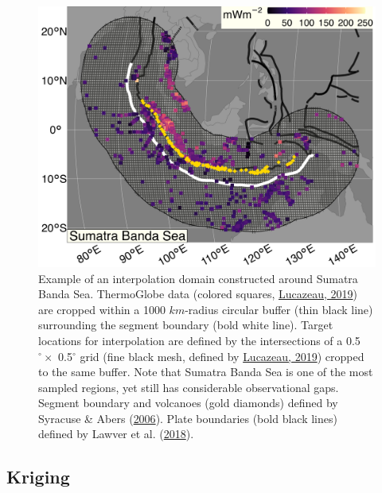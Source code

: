 \begin{figure}[htbp]

{\centering \includegraphics[width=1\linewidth,]{assets/figs/chpt3/SumatraBandaSeaInterp} 

}

\caption[Example of an interpolation domain constructed around Sumatra Banda Sea]{Example of an interpolation domain constructed around Sumatra Banda Sea. ThermoGlobe data (colored squares, \protect\hyperlink{ref-lucazeau2019}{Lucazeau, 2019}) are cropped within a 1000 \(km\)-radius circular buffer (thin black line) surrounding the segment boundary (bold white line). Target locations for interpolation are defined by the intersections of a 0.5\(^\circ \times\) 0.5\(^\circ\) grid (fine black mesh, defined by \protect\hyperlink{ref-lucazeau2019}{Lucazeau, 2019}) cropped to the same buffer. Note that Sumatra Banda Sea is one of the most sampled regions, yet still has considerable observational gaps. Segment boundary and volcanoes (gold diamonds) defined by Syracuse \& Abers (\protect\hyperlink{ref-syracuse2006}{2006}). Plate boundaries (bold black lines) defined by Lawver et al. (\protect\hyperlink{ref-lawver2018}{2018}).}\label{fig:domainConstruct}
\end{figure}

\hypertarget{kriging}{%
\subsection{Kriging}\label{kriging}}

